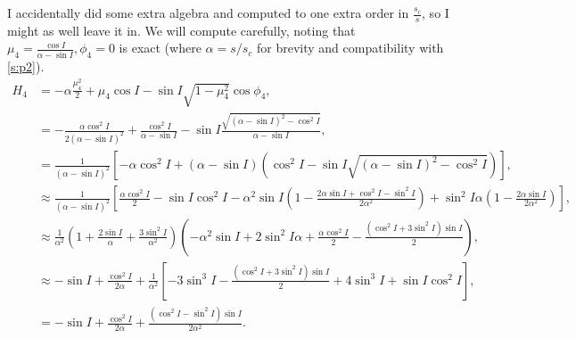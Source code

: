 \documentclass[11pt,
        usenames, %
        dvipsnames %
    ]{article}
\newcommand*{\p}[1]{\left(#1\right)}
\newcommand*{\s}[1]{\left[#1\right]}
\begin{document}
I accidentally did some extra algebra and computed to one extra order in
$\frac{s_c}{s}$, so I might as well leave it in. We will compute carefully,
noting that $\mu_4 = \frac{\cos I}{\alpha - \sin I}, \phi_4 = 0$ is exact (where
$\alpha = s/s_c$ for brevity and compatibility with \autoref{s:p2}).
\begin{align*}
    H_4 &= -\alpha \frac{\mu_4^2}{2} + \mu_4 \cos I - \sin I \sqrt{1 - \mu_4^2}
            \cos \phi_4,\\
        &= -\frac{\alpha \cos^2 I}{2(\alpha - \sin I)^2}
            + \frac{\cos^2 I}{\alpha - \sin I}
            - \sin I \frac{\sqrt{(\alpha - \sin I)^2 - \cos^2 I}}{
                \alpha - \sin I},\\
        &= \frac{1}{\p{\alpha - \sin I}^2}
            \s{-\alpha \cos^2 I + \p{\alpha - \sin I}
                \p{\cos^2 I - \sin I \sqrt{
                    (\alpha - \sin I)^2 - \cos^2 I}}},\\
        &\approx \frac{1}{\p{\alpha - \sin I}^2}
            \s{\frac{\alpha \cos^2 I}{2} -\sin I \cos^2 I - \alpha^2 \sin I
                \p{1 - \frac{2\alpha \sin I + \cos^2 I - \sin^2 I}{2\alpha^2}}
                + \sin^2 I\alpha\p{1 - \frac{2\alpha \sin I}{2\alpha^2}}},\\
        &\approx \frac{1}{\alpha^2}\p{1 + \frac{2\sin I}{\alpha}
            + \frac{3\sin^2 I}{\alpha^2}}\p{
                -\alpha^2 \sin I + 2\sin^2 I\alpha
                    + \frac{\alpha \cos^2 I}{2}
                    - \frac{(\cos^2 I + 3\sin^2 I)\sin I}{2}},\\
        &\approx -\sin I + \frac{\cos^2 I}{2\alpha}
            + \frac{1}{\alpha^2}\s{
                -3\sin^3 I - \frac{\p{\cos^2 I + 3\sin^2 I}\sin I}{2}
                    + 4\sin^3 I + \sin I \cos^2 I},\\
        &= -\sin I + \frac{\cos^2 I}{2\alpha}
            + \frac{\p{\cos^2 I - \sin^2 I}\sin I}{2\alpha^2}.
\end{align*}
\end{document}
